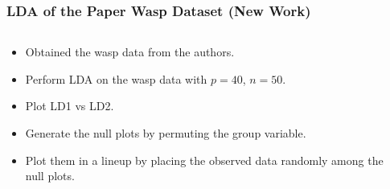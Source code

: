 \documentclass{beamer}
\begin{document}
\begin{frame}
	\frametitle{LDA of the Paper Wasp Dataset (New Work)}
	\begin{columns}
		\begin{column}{0.4\textwidth}
		  \begin{itemize}
		  	\item Obtained the wasp data from the authors. 
			  \item Perform LDA on the wasp data with $p = 40$, $n = 50$.
			\item Plot LD1 vs LD2.
			 \item Generate the null plots by permuting the group variable. 
			 \item Plot them in a lineup by placing the observed data randomly among the null plots.
 
		  \end{itemize}		
			
		\end{column}
		
		\begin{column}{0.6\textwidth}
			 \begin{center}  \end{center}
		\end{column}
	\end{columns}  

\end{frame}
\end{document}
